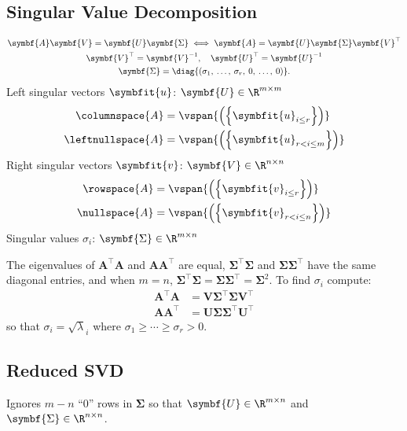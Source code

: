 \documentclass{article}
\begin{document}
\begin{multicols*}{3}
    \section{Singular Value Decomposition}
    \begin{gather*}
        \symbf{A} \symbf{V} = \symbf{U} \symbf{\Sigma}
        \iff
        \symbf{A} = \symbf{U} \symbf{\Sigma} \symbf{V}^\top                                        \\
        \symbf{V}^\top = \symbf{V}^{-1}, \quad \symbf{U}^\top = \symbf{U}^{-1}                                                          \\
        \symbf{\Sigma} = \diag{\left( \sigma_1,\: \dots,\: \sigma_r,\: 0,\: \dots,\: 0 \right)}.
    \end{gather*}
    Left singular vectors \(\symbfit{u}\): \(\symbf{U} \in \R^{m \times m}\)
    \begin{align*}
        \columnspace{A}   & = \vspan{\left( \left\{ \symbfit{u}_{i \leq r} \right\} \right)}     \\
        \leftnullspace{A} & = \vspan{\left( \left\{ \symbfit{u}_{r < i \leq m} \right\} \right)}
    \end{align*}
    Right singular vectors \(\symbfit{v}\): \(\symbf{V} \in  \R^{n \times n}\)
    \begin{align*}
        \rowspace{A}  & = \vspan{\left( \left\{ \symbfit{v}_{i \leq r} \right\} \right)}     \\
        \nullspace{A} & = \vspan{\left( \left\{ \symbfit{v}_{r < i \leq n} \right\} \right)}
    \end{align*}
    Singular values \(\sigma_i\): \(\symbf{\Sigma} \in \R^{m \times n}\)

    The eigenvalues of \(\symbf{A}^\top\symbf{A}\) and \(\symbf{A}\symbf{A}^\top\)
    are equal, \(\symbf{\Sigma}^\top \symbf{\Sigma}\) and \(\symbf{\Sigma} \symbf{\Sigma}^\top\) have the same diagonal entries, and
    when \(m = n\), \(\symbf{\Sigma}^\top\symbf{\Sigma} = \symbf{\Sigma} \symbf{\Sigma}^\top = \symbf{\Sigma}^2\).
    To find \(\sigma_i\) compute:
    \begin{align*}
        \symbf{A}^\top \symbf{A} & = \symbf{V} \symbf{\Sigma}^\top \symbf{\Sigma} \symbf{V}^\top \\
        \symbf{A} \symbf{A}^\top & = \symbf{U} \symbf{\Sigma} \symbf{\Sigma}^\top \symbf{U}^\top
    \end{align*}
    so that \(\sigma_i = \sqrt{\lambda}_i\) where \(\sigma_1 \geq \cdots \geq \sigma_r > 0\).
    \subsection{Reduced SVD}
    Ignores \(m - n\) ``0'' rows in \(\symbf{\Sigma}\) so that \(\symbf{U} \in \R^{m \times n}\) and \(\symbf{\Sigma} \in \R^{n \times n}\).

\end{multicols*}
\end{document}
